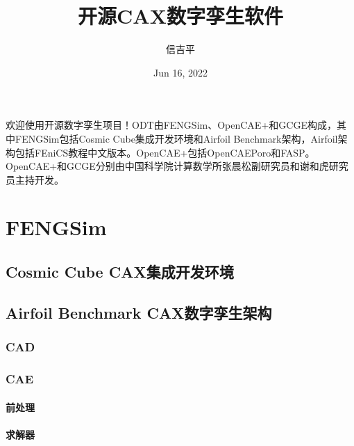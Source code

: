 \documentclass[letterpaper,10pt,english]{sphinxmanual}
\title{开源CAX数字孪生软件}
\date{Jun 16, 2022}
\author{信吉平}
\begin{document}
\pagestyle{empty}
\sphinxmaketitle
\pagestyle{plain}
\sphinxtableofcontents
\pagestyle{normal}
\label{\detokenize{index::doc}}
\sphinxstepscope



\sphinxAtStartPar
欢迎使用开源数字孪生项目！ODT由FENGSim、OpenCAE+和GCGE构成，其中FENGSim包括Cosmic Cube集成开发环境和Airfoil Benchmark架构，Airfoil架构包括FEniCS教程中文版本。OpenCAE+包括OpenCAEPoro和FASP。OpenCAE+和GCGE分别由中国科学院计算数学所张晨松副研究员和谢和虎研究员主持开发。

\sphinxstepscope


\chapter{FENGSim}
\label{\detokenize{src/fengsim/main:fengsim}}\label{\detokenize{src/fengsim/main::doc}}
\sphinxstepscope


\section{Cosmic Cube CAX集成开发环境}
\label{\detokenize{src/fengsim/cosmiccube:cosmic-cube-cax}}\label{\detokenize{src/fengsim/cosmiccube::doc}}
\sphinxstepscope


\section{Airfoil Benchmark CAX数字孪生架构}
\label{\detokenize{src/fengsim/airfoil:airfoil-benchmark-cax}}\label{\detokenize{src/fengsim/airfoil::doc}}

\subsection{CAD}
\label{\detokenize{src/fengsim/airfoil:cad}}

\subsection{CAE}
\label{\detokenize{src/fengsim/airfoil:cae}}

\subsubsection{前处理}
\label{\detokenize{src/fengsim/airfoil:id1}}

\subsubsection{求解器}
\label{\detokenize{src/fengsim/airfoil:id2}}
\end{document}
